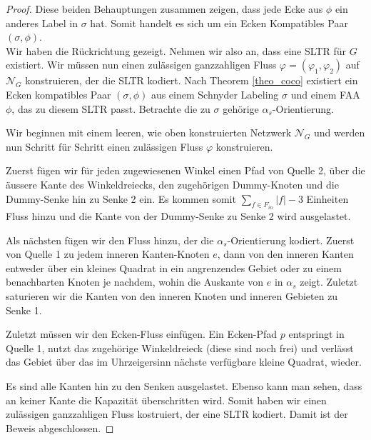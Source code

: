 \begin{proof}
Diese beiden Behauptungen zusammen zeigen, dass jede Ecke aus $\phi$ ein anderes Label in $\sigma$ hat. Somit handelt es sich um ein Ecken Kompatibles Paar $(\sigma,\phi)$.\\

Wir haben die Rückrichtung gezeigt. Nehmen wir also an, dass eine SLTR für $G$ existiert. Wir müssen nun einen zulässigen ganzzahligen Fluss $\varphi=(\varphi_1,\varphi_2)$ auf $\mathcal{N}_G$ konstruieren, der die SLTR kodiert. Nach Theorem \ref{theo_coco} existiert ein Ecken kompatibles Paar $(\sigma,\phi)$ aus einem Schnyder Labeling $\sigma$ und einem FAA $\phi$, das zu diesem SLTR passt. Betrachte die zu $\sigma$ gehörige $\alpha_s$-Orientierung.

Wir beginnen mit einem leeren, wie oben konstruierten Netzwerk $\mathcal{N}_G$ und werden nun Schritt für Schritt einen zulässigen Fluss $\varphi$ konstruieren.

Zuerst fügen wir für jeden zugewiesenen Winkel einen Pfad von Quelle 2, über die äussere Kante des Winkeldreiecks, den zugehörigen Dummy-Knoten und die Dummy-Senke hin zu Senke 2 ein. Es kommen somit $\sum_{f \in F_{in}}|f|-3$ Einheiten Fluss hinzu und die Kante von der Dummy-Senke zu Senke 2 wird ausgelastet.

Als nächsten fügen wir den Fluss hinzu, der die $\alpha_s$-Orientierung kodiert. Zuerst von Quelle 1 zu jedem inneren Kanten-Knoten $e$, dann von den inneren Kanten entweder über ein kleines Quadrat in ein angrenzendes Gebiet oder zu einem benachbarten Knoten je nachdem, wohin die Auskante von $e$ in $\alpha_s$ zeigt. Zuletzt saturieren wir die Kanten von den inneren Knoten und inneren Gebieten zu Senke 1.

Zuletzt müssen wir den Ecken-Fluss einfügen. Ein Ecken-Pfad $p$ entspringt in Quelle 1, nutzt das zugehörige Winkeldreieck (diese sind noch frei) und verlässt das Gebiet über das im Uhrzeigersinn nächste verfügbare kleine Quadrat, wieder. 

Es sind alle Kanten hin zu den Senken ausgelastet. Ebenso kann man sehen, dass an keiner Kante die Kapazität überschritten wird. Somit haben wir einen zulässigen ganzzahligen Fluss kostruiert, der eine SLTR kodiert. Damit ist der Beweis abgeschlossen.

\end{proof}


